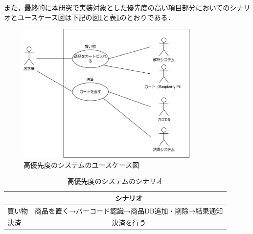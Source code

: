 また，最終的に本研究で実装対象とした優先度の高い項目部分においてのシナリオとユースケース図は下記の図\ref{use}と表\ref{sina}のとおりである．


\begin{figure}[htbp]
\centering
\includegraphics[width = 9cm]{./picture/usecase_saishu.eps}
\caption{高優先度のシステムのユースケース図}
\label{use}
\end{figure}

\begin{table}[htbp]
\begin{center}
\caption{高優先度のシステムのシナリオ}
\begin{tabular}{|l|c|} \hline
 & シナリオ \\ \hline \hline
買い物 & 商品を置く→バーコード認識→商品DB追加・削除→結果通知 \\
決済 & 決済を行う \\ \hline
\end{tabular}
\label{sina}
\end{center}
\end{table}

\newpage